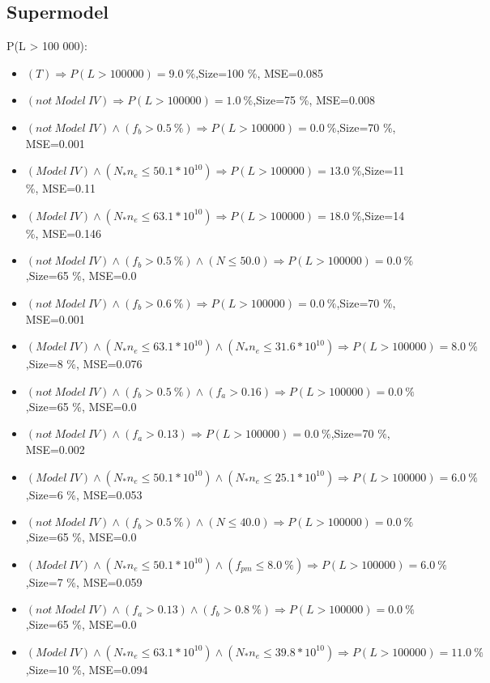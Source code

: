 \documentclass[numbered]{CSL}
\begin{document}
\subsection{Supermodel}
P(L > 100 000):
\begin{itemize}
\item $(T) \Rightarrow P(L > 100 000) = 9.0~\%$,\hfill Size=100 \%, MSE=0.085
\item $(not~Model~IV) \Rightarrow P(L > 100 000) = 1.0~\%$,\hfill Size=75 \%, MSE=0.008
\item $(not~Model~IV) \land (f_b > 0.5~\%) \Rightarrow P(L > 100 000) = 0.0~\%$,\hfill Size=70 \%, MSE=0.001
\item $(Model~IV) \land (N_* n_e \leq 50.1 * 10^{10}) \Rightarrow P(L > 100 000) = 13.0~\%$,\hfill Size=11 \%, MSE=0.11
\item $(Model~IV) \land (N_* n_e \leq 63.1 * 10^{10}) \Rightarrow P(L > 100 000) = 18.0~\%$,\hfill Size=14 \%, MSE=0.146
\item $(not~Model~IV) \land (f_b > 0.5~\%) \land (N \leq 50.0) \Rightarrow P(L > 100 000) = 0.0~\%$,\hfill Size=65 \%, MSE=0.0
\item $(not~Model~IV) \land (f_b > 0.6~\%) \Rightarrow P(L > 100 000) = 0.0~\%$,\hfill Size=70 \%, MSE=0.001
\item $(Model~IV) \land (N_* n_e \leq 63.1 * 10^{10}) \land (N_* n_e \leq 31.6 * 10^{10}) \Rightarrow P(L > 100 000) = 8.0~\%$,\hfill Size=8 \%, MSE=0.076
\item $(not~Model~IV) \land (f_b > 0.5~\%) \land (f_a > 0.16) \Rightarrow P(L > 100 000) = 0.0~\%$,\hfill Size=65 \%, MSE=0.0
\item $(not~Model~IV) \land (f_a > 0.13) \Rightarrow P(L > 100 000) = 0.0~\%$,\hfill Size=70 \%, MSE=0.002
\item $(Model~IV) \land (N_* n_e \leq 50.1 * 10^{10}) \land (N_* n_e \leq 25.1 * 10^{10}) \Rightarrow P(L > 100 000) = 6.0~\%$,\hfill Size=6 \%, MSE=0.053
\item $(not~Model~IV) \land (f_b > 0.5~\%) \land (N \leq 40.0) \Rightarrow P(L > 100 000) = 0.0~\%$,\hfill Size=65 \%, MSE=0.0
\item $(Model~IV) \land (N_* n_e \leq 50.1 * 10^{10}) \land (f_{pm} \leq 8.0~\%) \Rightarrow P(L > 100 000) = 6.0~\%$,\hfill Size=7 \%, MSE=0.059
\item $(not~Model~IV) \land (f_a > 0.13) \land (f_b > 0.8~\%) \Rightarrow P(L > 100 000) = 0.0~\%$,\hfill Size=65 \%, MSE=0.0
\item $(Model~IV) \land (N_* n_e \leq 63.1 * 10^{10}) \land (N_* n_e \leq 39.8 * 10^{10}) \Rightarrow P(L > 100 000) = 11.0~\%$,\hfill Size=10 \%, MSE=0.094

\end{itemize}
\end{document}
